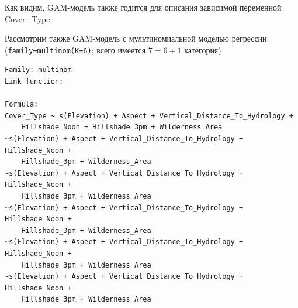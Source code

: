 \documentclass[12pt]{article}
\begin{document}
Как видим, GAM-модель также годится для описания зависимой переменной Cover\_Type.

Рассмотрим также GAM-модель с мультиномиальной моделью регрессии:
(\verb|family=multinom(K=6)|; всего имеется $7 = 6 + 1$ категория)

\begin{verbatim}
Family: multinom
Link function:

Formula:
Cover_Type ~ s(Elevation) + Aspect + Vertical_Distance_To_Hydrology +
    Hillshade_Noon + Hillshade_3pm + Wilderness_Area
~s(Elevation) + Aspect + Vertical_Distance_To_Hydrology + Hillshade_Noon +
    Hillshade_3pm + Wilderness_Area
~s(Elevation) + Aspect + Vertical_Distance_To_Hydrology + Hillshade_Noon +
    Hillshade_3pm + Wilderness_Area
~s(Elevation) + Aspect + Vertical_Distance_To_Hydrology + Hillshade_Noon +
    Hillshade_3pm + Wilderness_Area
~s(Elevation) + Aspect + Vertical_Distance_To_Hydrology + Hillshade_Noon +
    Hillshade_3pm + Wilderness_Area
~s(Elevation) + Aspect + Vertical_Distance_To_Hydrology + Hillshade_Noon +
    Hillshade_3pm + Wilderness_Area


\end{verbatim}
\end{document}
